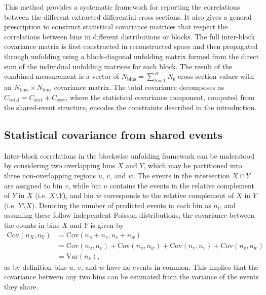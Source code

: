 \documentclass[a4paper,11pt]{article}
\begin{document}
This method provides a systematic framework for reporting the correlations between the different extracted differential cross sections. It also gives a general prescription to construct statistical covariance matrices that respect the correlations between bins in different distributions or blocks. The full inter-block covariance matrix is first constructed in reconstructed space and then propagated through unfolding using a block-diagonal unfolding matrix formed from the direct sum of the individual unfolding matrices for each block. The result of the combined measurement is a vector of $N_{\text{bins}} = \sum_{b=1}^{B} N_b$ cross-section values with an $N_{\text{bins}} \times N_{\text{bins}}$ covariance matrix. The total covariance decomposes as $C_{\text{total}} = C_{\text{stat}} + C_{\text{syst}}$, where the statistical covariance component, computed from the shared-event structure, encodes the constraints described in the introduction.

\subsection{Statistical covariance from shared events}
\label{subsec:statistical_cov}

Inter-block correlations in the blockwise unfolding framework can be understood by considering two overlapping bins $X$ and $Y$, which may be partitioned into three non-overlapping regions $u$, $v$, and $w$. The events in the intersection $X \cap Y$ are assigned to bin $v$, while bin $u$ contains the events in the relative complement of $Y$ in $X$ (i.e. $X \setminus Y$), and bin $w$ corresponds to the relative complement of $X$ in $Y$ (i.e. $Y \setminus X$). Denoting the number of predicted events in each bin as $n_{i}$, and assuming these follow independent Poisson distributions, the covariance between the counts in bins $X$ and $Y$ is given by \cite{Gardiner:2024gdy}
\begin{equation}
    \begin{split}
        \text{Cov}(n_{X}, n_{Y}) &= \text{Cov}(n_{u} + n_{v}, n_{v} + n_{w})\\
        &= \text{Cov}(n_{u}, n_{v}) + \text{Cov}(n_{u}, n_{w}) + \text{Cov}(n_{v}, n_{v}) + \text{Cov}(n_{v}, n_{w})\\
        &= \text{Var}(n_{v}),
    \end{split}
\end{equation}
as by definition bins $u$, $v$, and $w$ have no events in common. This implies that the covariance between any two bins can be estimated from the variance of the events they share.
\end{document}
